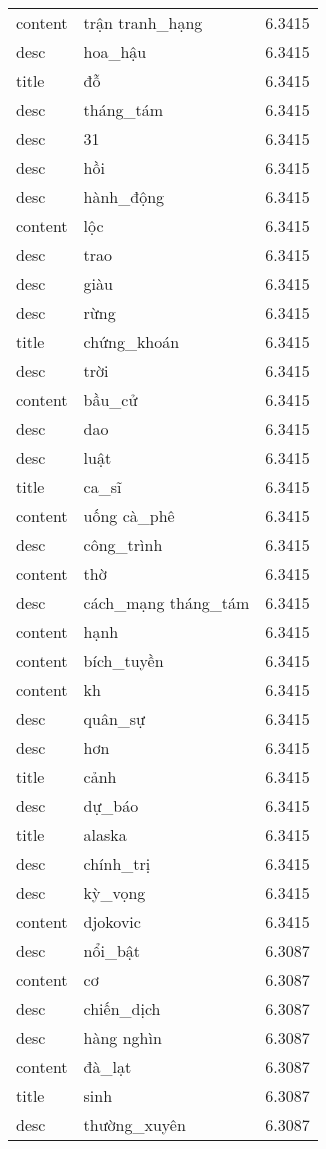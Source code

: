 \documentclass{article}
\begin{document}
\begin{tabular}{lll}
content & trận tranh\_hạng & 6.3415\\
desc & hoa\_hậu & 6.3415\\
title & đỗ & 6.3415\\
desc & tháng\_tám & 6.3415\\
desc & 31 & 6.3415\\
desc & hồi & 6.3415\\
desc & hành\_động & 6.3415\\
content & lộc & 6.3415\\
desc & trao & 6.3415\\
desc & giàu & 6.3415\\
desc & rừng & 6.3415\\
title & chứng\_khoán & 6.3415\\
desc & trời & 6.3415\\
content & bầu\_cử & 6.3415\\
desc & dao & 6.3415\\
desc & luật & 6.3415\\
title & ca\_sĩ & 6.3415\\
content & uống cà\_phê & 6.3415\\
desc & công\_trình & 6.3415\\
content & thờ & 6.3415\\
desc & cách\_mạng tháng\_tám & 6.3415\\
content & hạnh & 6.3415\\
content & bích\_tuyền & 6.3415\\
content & kh & 6.3415\\
desc & quân\_sự & 6.3415\\
desc & hơn & 6.3415\\
title & cảnh & 6.3415\\
desc & dự\_báo & 6.3415\\
title & alaska & 6.3415\\
desc & chính\_trị & 6.3415\\
desc & kỳ\_vọng & 6.3415\\
content & djokovic & 6.3415\\
desc & nổi\_bật & 6.3087\\
content & cơ & 6.3087\\
desc & chiến\_dịch & 6.3087\\
desc & hàng nghìn & 6.3087\\
content & đà\_lạt & 6.3087\\
title & sinh & 6.3087\\
desc & thường\_xuyên & 6.3087\\

\end{tabular}
\end{document}
